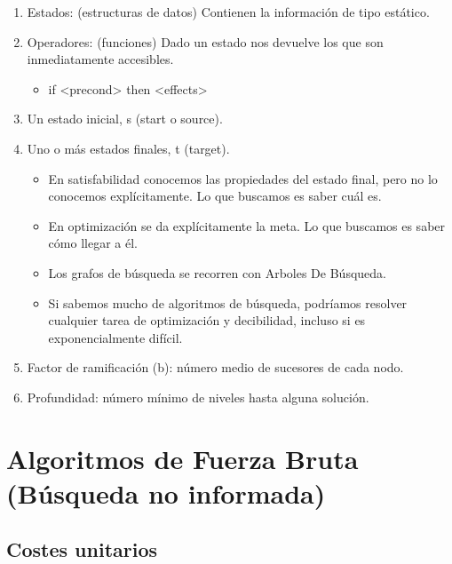 \documentclass[12pt, twoside, openright]{report} %
\begin{document}
  \begin{enumerate}

  \item
    Estados: (estructuras de datos) Contienen la información de tipo
    estático.
  \item
    Operadores: (funciones) Dado un estado nos devuelve los que son
    inmediatamente accesibles.

    \begin{itemize}
  
    \item
      if <precond> then <effects>
    \end{itemize}
  \item
    Un estado inicial, s (start o source).
  \item
    Uno o más estados finales, t (target).

    \begin{itemize}
    \item
      En satisfabilidad conocemos las propiedades del estado final, pero
      no lo conocemos explícitamente. Lo que buscamos es saber cuál es.
    \item
      En optimización se da explícitamente la meta. Lo que buscamos es
      saber cómo llegar a él.
    \item
      Los grafos de búsqueda se recorren con Arboles De Búsqueda.
    \item
      Si sabemos mucho de algoritmos de búsqueda, podríamos resolver
      cualquier tarea de optimización y decibilidad, incluso si es
      exponencialmente difícil.
    \end{itemize}
  \item
    Factor de ramificación (b): número medio de sucesores de cada nodo.
  \item
    Profundidad: número mínimo de niveles hasta alguna solución.
  \end{enumerate}

\section{Algoritmos de Fuerza Bruta (Búsqueda no informada)}
\subsection{Costes unitarios}
\end{document}
